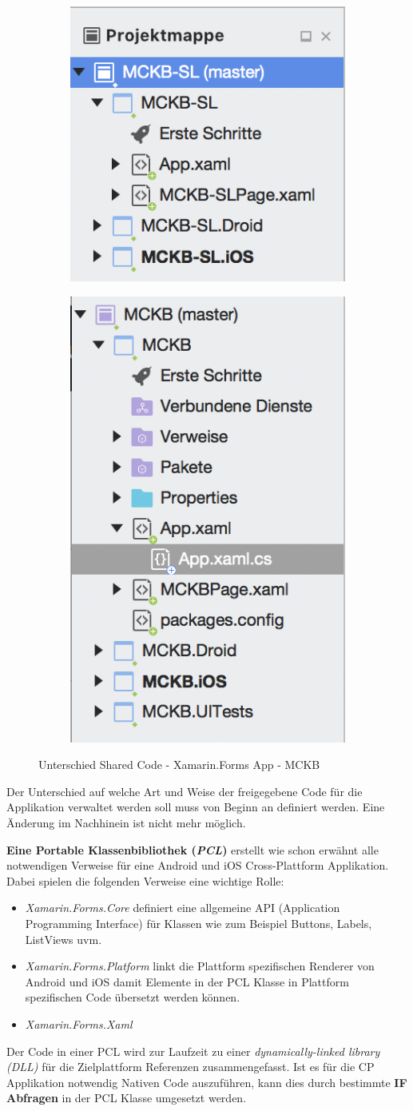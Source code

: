	\newpage
	\begin{figure}[h!]
		\centering
		\begin{subfigure}
			\centering
			\includegraphics[width=.3\textwidth]{images/xamarin-shared-library.png}
		\end{subfigure}
		\begin{subfigure}
			\centering
			\includegraphics[width=.3\textwidth]{images/xamarin-portable-class.png}
		\end{subfigure}
		\caption{Unterschied Shared Code - Xamarin.Forms App - MCKB}
		\label{fig:xamarinsharedcode}
	\end{figure}

	Der Unterschied auf welche Art und Weise der freigegebene Code für die Applikation verwaltet werden soll muss von Beginn an definiert werden. Eine Änderung im Nachhinein ist nicht mehr möglich.

	\textbf{Eine Portable Klassenbibliothek (\textit{PCL})} erstellt wie schon erwähnt alle notwendigen Verweise für eine Android und iOS Cross-Plattform Applikation. Dabei spielen die folgenden Verweise eine wichtige Rolle:
	\begin{itemize}
		\setlength\itemsep{0em}
		\item \textit{Xamarin.Forms.Core} definiert eine allgemeine API (Application Programming Interface) für Klassen wie zum Beispiel Buttons, Labels, ListViews uvm.
		\item \textit{Xamarin.Forms.Platform} linkt die Plattform spezifischen Renderer von Android und iOS damit Elemente in der PCL Klasse in Plattform spezifischen Code übersetzt werden können.
		\item \textit{Xamarin.Forms.Xaml}
	\end{itemize}
	Der Code in einer PCL wird zur Laufzeit zu einer \textit{dynamically-linked library (DLL)} für die Zielplattform Referenzen zusammengefasst. Ist es für die CP Applikation notwendig Nativen Code auszuführen, kann dies durch bestimmte \textbf{IF Abfragen} in der PCL Klasse umgesetzt werden.\\

